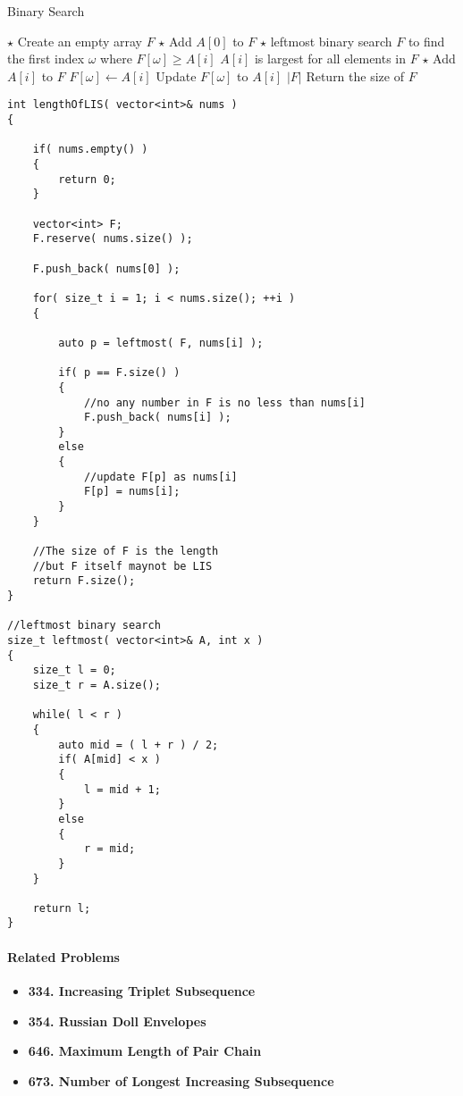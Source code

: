 \begin{algorithm}[H]
\caption{Binary Search}
\begin{algorithmic}[1]
\State $\star$ Create an empty array $F$
\State $\star$ Add $A[0]$ to $F$
\State $\star$ leftmost binary search $F$ to find the first index $\omega$ where $F[\omega]\geq A[i]$
 \Comment $A[i]$ is largest for all elements in $F$
\State  $\star$ Add $A[i]$ to $F$
\Else
\State $F[\omega]\gets A[i]$ \Comment Update $F[\omega]$ to $A[i]$
\EndIf
\EndFor
\State \Return $ \lvert F\vert $ \Comment Return the size of $F$
\EndProcedure
\end{algorithmic}
\end{algorithm}

\begin{lstlisting}[style=customc, caption={Binary Search}]
int lengthOfLIS( vector<int>& nums )
{

    if( nums.empty() )
    {
        return 0;
    }

    vector<int> F;
    F.reserve( nums.size() );

    F.push_back( nums[0] );

    for( size_t i = 1; i < nums.size(); ++i )
    {

        auto p = leftmost( F, nums[i] );

        if( p == F.size() )
        {
            //no any number in F is no less than nums[i]
            F.push_back( nums[i] );
        }
        else
        {
            //update F[p] as nums[i]
            F[p] = nums[i];
        }
    }

    //The size of F is the length
    //but F itself maynot be LIS
    return F.size();
}

//leftmost binary search
size_t leftmost( vector<int>& A, int x )
{
    size_t l = 0;
    size_t r = A.size();

    while( l < r )
    {
        auto mid = ( l + r ) / 2;
        if( A[mid] < x )
        {
            l = mid + 1;
        }
        else
        {
            r = mid;
        }
    }

    return l;
}
\end{lstlisting}

\paragraph{Related Problems}
\begin{itemize}
\item \textbf{334. Increasing Triplet Subsequence}
\item \textbf{354. Russian Doll Envelopes}
\item \textbf{646. Maximum Length of Pair Chain}
\item \textbf{673. Number of Longest Increasing Subsequence}
\end{itemize}